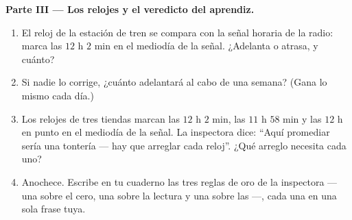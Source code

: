 \begin{problem}
\medskip\noindent\textbf{Parte III --- Los relojes y el veredicto del
aprendiz.}
\begin{enumerate}[resume]
  \item El reloj de la estación de tren se compara con la señal horaria de la
        radio: marca las $12$ h $2$ min en el mediodía de la señal.
        ¿Adelanta o atrasa, y cuánto?
  \item Si nadie lo corrige, ¿cuánto adelantará al cabo de una
        semana? (Gana lo mismo cada día.)
  \item Los relojes de tres tiendas marcan las $12$ h $2$ min, las
        $11$ h $58$ min y las $12$ h en punto en el mediodía de la
        señal. La inspectora dice: ``Aquí promediar sería una tontería
        --- hay que arreglar cada reloj''. ¿Qué arreglo necesita cada
        uno?
  \item Anochece. Escribe en tu cuaderno las tres reglas de oro de la
        inspectora --- una sobre el cero, una sobre la lectura y una
        sobre las  ---, cada una en una sola frase tuya.
\end{enumerate}
\end{problem}
